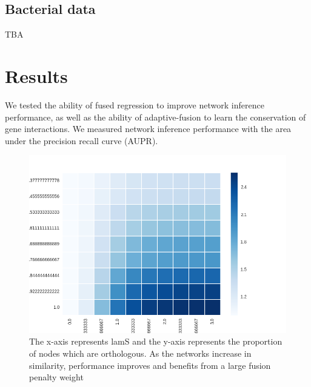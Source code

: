 \documentclass[11pt]{article}
\begin{document}
\subsection{Bacterial data}
TBA

\section{Results}
We tested the ability of fused regression to improve network inference performance, as well as the ability of adaptive-fusion to learn the conservation of gene interactions. We measured network inference performance with the area under the precision recall curve (AUPR). 

\begin{figure}
\begin{center}
  \includegraphics[scale=0.45]{l2fusionquick.png}
  \caption{\label{fig:figure1} The x-axis represents lamS and the y-axis represents the proportion of nodes which are orthologous. As the networks increase in similarity, performance improves and benefits from a large fusion penalty weight}
  \end{center}
\end{figure}
\end{document}
